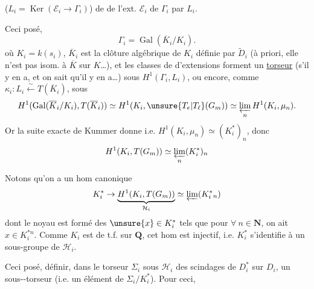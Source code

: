 

($L_i=\operatorname{Ker}(\mathcal{E}_i\to\Gamma_i)$) de   de l'ext. $\mathcal{E}_i$ de $\Gamma_i$ par $L_i$.

Ceci posé, 
\[
\Gamma_i=\operatorname{Gal}(\overline{K}_i/K_i).
\]
où $K_i=k(s_i)$, $\overline{K}_i$ est la clôture algébrique de $K_i$ définie par $\widetilde{D}_i$ (à priori, elle n'est pas  isom. à $\overline{K}$ sur $K$\ldots), et les classes de   d'extensions forment un \uline{torseur}  (s'il y en a, et on sait qu'il y en a\ldots) sous $H^1(\Gamma_i,L_i)$, ou encore, comme $\kappa_i:L_i\xleftarrow{\sim}T(\overline{K}_i)$, sous
\[
H^1(\operatorname{Gal}(\overline{K}_i/K_i),T(\overline{K}_i))
\simeq H^1(K_i,\unsure{T_e|T_\ell}(G_m))
\simeq\varprojlim_n H^1(K_i,\mu_n).
\]
Or la suite exacte de Kummer donne
i.e. $H^1(K_i,\mu_n)\simeq(K_i^*)_n$, donc
\[
H^1(K_i,T(G_m))\simeq\varprojlim_n(K_i^*)_n
\]



Notons qu'on a un hom canonique
\[
K_i^*\to\underbrace{H^1(K_i,T(G_m))}_{\mathcal{H}_i}
\simeq\varprojlim(K_i^*{}_n)
\]
dont le noyau est formé des $\unsure{x}\in K_i^*$ tels que pour $\forall\ n\in\mathbf{N}$, on ait $x\in K_i^{*n}$.
Comme $K_i$ est de t.f. sur $\mathbf{Q}$, cet hom est injectif, i.e. $K_i^*$ s'identifie à un sous-groupe de $\mathcal{H}_i$.

Ceci posé,  définir, dans le torseur $\Sigma_i$ sous $\mathcal{H}_i$ des scindages de $D_i^*$ sur $D_i$, un sous--torseur (i.e. un élément de $\Sigma_i/K_i^*$).
Pour ceci,


